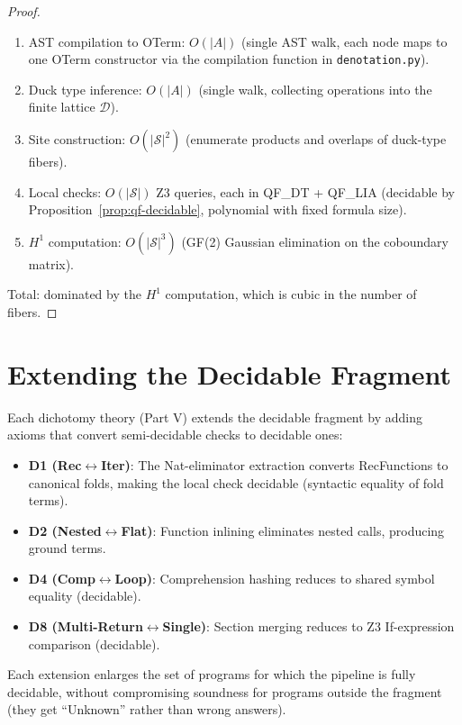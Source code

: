\documentclass[11pt,a4paper]{report}
\theoremstyle{definition}
\theoremstyle{plain}
\newcommand{\Hone}{H^1}
\newcommand{\site}{\mathcal{S}}
\begin{document}
\begin{proof}
\begin{enumerate}
  \item AST compilation to OTerm: $O(|A|)$ (single AST walk,
    each node maps to one OTerm constructor via the compilation
    function in \texttt{denotation.py}).
  \item Duck type inference: $O(|A|)$ (single walk, collecting
    operations into the finite lattice $\mathcal{D}$).
  \item Site construction: $O(|\site|^2)$ (enumerate products and
    overlaps of duck-type fibers).
  \item Local checks: $O(|\site|)$ Z3 queries, each in QF\_DT +
    QF\_LIA (decidable by Proposition~\ref{prop:qf-decidable},
    polynomial with fixed formula size).
  \item $\Hone$ computation: $O(|\site|^3)$ (GF(2) Gaussian
    elimination on the coboundary matrix).
\end{enumerate}
Total: dominated by the $\Hone$ computation, which is cubic in the
number of fibers.
\end{proof}

\section{Extending the Decidable Fragment}

Each dichotomy theory (Part V) extends the decidable fragment by
adding axioms that convert semi-decidable checks to decidable ones:

\begin{itemize}
  \item \textbf{D1 (Rec$\leftrightarrow$Iter)}: The Nat-eliminator
    extraction converts RecFunctions to canonical folds, making the
    local check decidable (syntactic equality of fold terms).
  \item \textbf{D2 (Nested$\leftrightarrow$Flat)}: Function inlining
    eliminates nested calls, producing ground terms.
  \item \textbf{D4 (Comp$\leftrightarrow$Loop)}: Comprehension hashing
    reduces to shared symbol equality (decidable).
  \item \textbf{D8 (Multi-Return$\leftrightarrow$Single)}: Section
    merging reduces to Z3 If-expression comparison (decidable).
\end{itemize}

Each extension enlarges the set of programs for which the pipeline
is fully decidable, without compromising soundness for programs
outside the fragment (they get ``Unknown'' rather than wrong answers).
\end{document}
